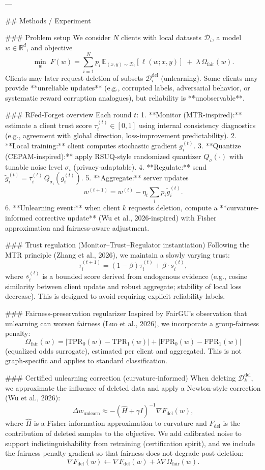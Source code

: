 ---

## Methods / Experiment  

### Problem setup  
We consider \(N\) clients with local datasets \(\mathcal{D}_i\), a model \(w \in \mathbb{R}^d\), and objective
\[
\min_w \; F(w) = \sum_{i=1}^N p_i \, \mathbb{E}_{(x,y)\sim \mathcal{D}_i}[\ell(w;x,y)] \;+\; \lambda \,\Omega_{\text{fair}}(w).
\]
Clients may later request deletion of subsets \(\mathcal{D}_i^{\text{del}}\) (unlearning). Some clients may provide **unreliable updates** (e.g., corrupted labels, adversarial behavior, or systematic reward corruption analogues), but reliability is **unobservable**.

### RFed-Forget overview  
Each round \(t\):  
1. **Monitor (MTR-inspired):** estimate a client trust score \(\tau_i^{(t)} \in [0,1]\) using internal consistency diagnostics (e.g., agreement with global direction, loss-improvement predictability).  
2. **Local training:** client computes stochastic gradient \(g_i^{(t)}\).  
3. **Quantize (CEPAM-inspired):** apply RSUQ-style randomized quantizer \(Q_\sigma(\cdot)\) with tunable noise level \(\sigma_i\) (privacy-adaptable).  
4. **Regulate:** send \(\tilde g_i^{(t)} = \tau_i^{(t)} \, Q_{\sigma_i}(g_i^{(t)})\).  
5. **Aggregate:** server updates
\[
w^{(t+1)} = w^{(t)} - \eta_t \sum_i p_i \tilde g_i^{(t)}.
\]
6. **Unlearning event:** when client \(k\) requests deletion, compute a **curvature-informed corrective update** (Wu et al., 2026-inspired) with Fisher approximation and fairness-aware adjustment.

### Trust regulation (Monitor–Trust–Regulator instantiation)  
Following the MTR principle (Zhang et al., 2026), we maintain a slowly varying trust:
\[
\tau_i^{(t+1)} = (1-\beta)\tau_i^{(t)} + \beta \cdot s_i^{(t)},
\]
where \(s_i^{(t)}\) is a bounded score derived from endogenous evidence (e.g., cosine similarity between client update and robust aggregate; stability of local loss decrease). This is designed to avoid requiring explicit reliability labels.

### Fairness-preservation regularizer  
Inspired by FairGU’s observation that unlearning can worsen fairness (Luo et al., 2026), we incorporate a group-fairness penalty:
\[
\Omega_{\text{fair}}(w) = \left|\text{TPR}_0(w)-\text{TPR}_1(w)\right| + \left|\text{FPR}_0(w)-\text{FPR}_1(w)\right|
\]
(equalized odds surrogate), estimated per client and aggregated. This is not graph-specific and applies to standard classification.

### Certified unlearning correction (curvature-informed)  
When deleting \(\mathcal{D}_k^{\text{del}}\), we approximate the influence of deleted data and apply a Newton-style correction (Wu et al., 2026):
\[
\Delta w_{\text{unlearn}} \approx - \left(\widehat{H} + \gamma I\right)^{-1} \nabla F_{\text{del}}(w),
\]
where \(\widehat{H}\) is a Fisher-information approximation to curvature and \(F_{\text{del}}\) is the contribution of deleted samples to the objective. We add calibrated noise to support indistinguishability from retraining (certification spirit), and we include the fairness penalty gradient so that fairness does not degrade post-deletion:
\[
\nabla F_{\text{del}}(w) \leftarrow \nabla F_{\text{del}}(w) + \lambda \nabla \Omega_{\text{fair}}(w).
\]

